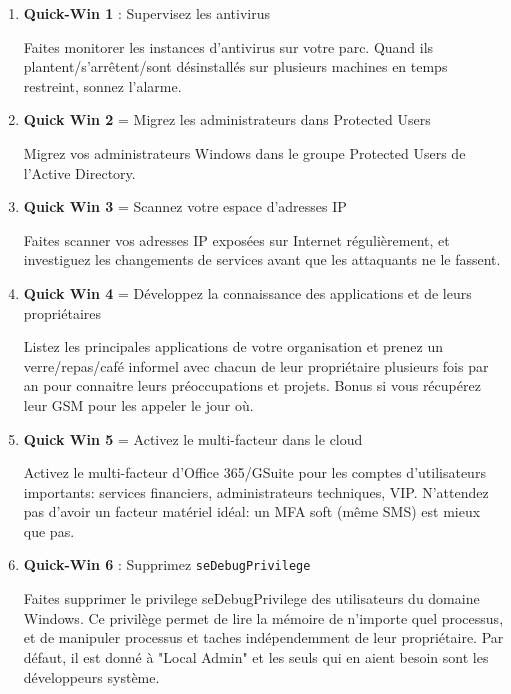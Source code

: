 \documentclass[a4paper]{article}
\begin{document}
\begin{enumerate}
    \item \textbf{Quick-Win 1} : Supervisez les antivirus
    \begin{example}
        Faites monitorer les instances d'antivirus sur votre parc. Quand ils plantent/s’arrêtent/sont désinstallés sur plusieurs machines en temps restreint, sonnez l'alarme.
    \end{example}
    \item \textbf{Quick Win 2} = Migrez les administrateurs dans Protected Users
    \begin{example}
        Migrez vos administrateurs Windows dans le groupe Protected Users de l'Active Directory.
    \end{example}
    \item \textbf{Quick Win 3} = Scannez votre espace d'adresses IP
    \begin{example}
        Faites scanner vos adresses IP exposées sur Internet régulièrement, et investiguez les changements de services avant que les attaquants ne le fassent.
    \end{example}
    \item \textbf{Quick Win 4} = Développez la connaissance des applications et de leurs propriétaires
    \begin{example}
        Listez les principales applications de votre organisation et prenez un verre/repas/café informel avec chacun de leur propriétaire plusieurs fois par an pour connaitre leurs préoccupations et projets. Bonus si vous récupérez leur GSM pour les appeler le jour où.
    \end{example}
    \item \textbf{Quick Win 5} = Activez le multi-facteur dans le cloud
    \begin{example}
        Activez le multi-facteur d'Office 365/GSuite pour les comptes d'utilisateurs importants: services financiers, administrateurs techniques, VIP. N'attendez pas d'avoir un facteur matériel idéal: un MFA soft (même SMS) est mieux que pas.
    \end{example}
    \item \textbf{Quick-Win 6} : Supprimez \texttt{seDebugPrivilege}
    \begin{example}
        Faites supprimer le privilege seDebugPrivilege des utilisateurs du domaine Windows. Ce privilège permet de lire la mémoire de n'importe quel processus, et de manipuler processus et taches indépendemment de leur propriétaire. Par défaut, il est donné à "Local Admin" et les seuls qui en aient besoin sont les développeurs système.

\end{example}
\end{enumerate}
\end{document}
